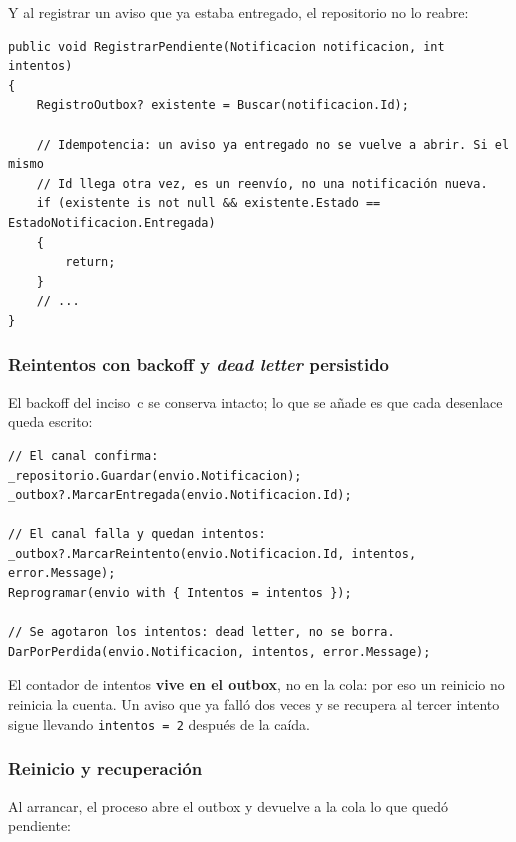 Y al registrar un aviso que ya estaba entregado, el repositorio no lo reabre:

\begin{lstlisting}[basicstyle=\ttfamily\footnotesize, columns=fullflexible, keepspaces=true]
public void RegistrarPendiente(Notificacion notificacion, int intentos)
{
    RegistroOutbox? existente = Buscar(notificacion.Id);

    // Idempotencia: un aviso ya entregado no se vuelve a abrir. Si el mismo
    // Id llega otra vez, es un reenvío, no una notificación nueva.
    if (existente is not null && existente.Estado == EstadoNotificacion.Entregada)
    {
        return;
    }
    // ...
}
\end{lstlisting}

\subsubsection{Reintentos con backoff y \emph{dead letter} persistido}

El backoff del inciso~c se conserva intacto; lo que se añade es que cada desenlace queda
escrito:

\begin{lstlisting}[basicstyle=\ttfamily\footnotesize, columns=fullflexible, keepspaces=true, caption={Los tres desenlaces del envío, y lo que queda en el outbox.}]
// El canal confirma:
_repositorio.Guardar(envio.Notificacion);
_outbox?.MarcarEntregada(envio.Notificacion.Id);

// El canal falla y quedan intentos:
_outbox?.MarcarReintento(envio.Notificacion.Id, intentos, error.Message);
Reprogramar(envio with { Intentos = intentos });

// Se agotaron los intentos: dead letter, no se borra.
DarPorPerdida(envio.Notificacion, intentos, error.Message);
\end{lstlisting}

El contador de intentos \textbf{vive en el outbox}, no en la cola: por eso un reinicio no reinicia
la cuenta. Un aviso que ya falló dos veces y se recupera al tercer intento sigue llevando
\texttt{intentos = 2} después de la caída.

\subsubsection{Reinicio y recuperación}

Al arrancar, el proceso abre el outbox y devuelve a la cola lo que quedó pendiente:

